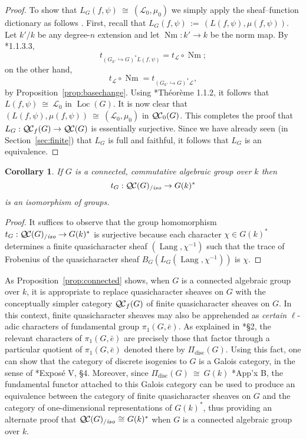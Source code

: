 \documentclass[11pt]{amsart}
\theoremstyle{plain}
\newtheorem{corollary}[theorem]{Corollary}
\theoremstyle{definition}
\theoremstyle{remark}
\newcommand{\bFq}{\bar{k}}
\newcommand{\Fq}{k}
\DeclareMathOperator{\Gal}{Gal}
\DeclareMathOperator{\Nm}{Nm}
\newcommand{\ceq}{{\, :=\, }}
\newcommand{\iso}{{\ \cong\ }}
\newcommand{\qcs}[1]{{\mathcal{#1}}}
\newcommand{\QC}{{\mathcal{Q\hskip-0.8pt C}}}
\newcommand{\QCb}{{\QC_0}}
\newcommand{\QCf}{{\QC_f}}
\newcommand{\QCiso}[1]{\QC(#1)_{/\textit{iso}}}
\newcommand{\Lang}{{\operatorname{Lang}}}
\newcommand{\Loc}{{\operatorname{Loc}}}
\newcommand{\trFrob}[1]{t_{#1}}
\begin{document}
\begin{proof}
  To show that $L_G(f,\psi) \iso (\qcs{L}_0,\mu_0)$ we simply apply the sheaf--function dictionary
  as follows .
  First, recall that $L_G(f,\psi) \ceq (L(f,\psi), \mu(f,\psi))$.
  Let $k'/k$ be any degree-$n$ extension and let $\Nm : k'\to k$ be the norm map. 
  By \cite{laumon:87a}*{1.1.3.3}, 
  \[
  \trFrob{(G_{k'}\hookrightarrow G)^*L(f,\psi)} = \trFrob{\qcs{L}} \circ \Nm;
  \]
  on the other hand, 
  \[
  \trFrob{\qcs{L}} \circ \Nm = \trFrob{(G_{k'}\hookrightarrow G)^*\qcs{L}},
  \]
   by Proposition~\ref{prop:basechange}.
  Using \cite{laumon:87a}*{Th\'eor\`eme 1.1.2}, it follows that  $L(f,\psi) \iso \qcs{L}_0$ in $\Loc(G)$.
  It is now clear that $(L(f,\psi),\mu(f,\psi)) \iso (\qcs{L}_0,\mu_0)$ in $\QCb(G)$.
  This completes the proof that $L_G : \QCf(G) \to \QC(G)$ is essentially surjective.
  Since we have already seen (in Section~\ref{sec:finite}) that $L_G$ is full and faithful, 
  it follows that $L_G$ is an equivalence.
\end{proof}

\begin{corollary}
 If $G$ is a connected, commutative algebraic group over $\Fq$ then
 \[
  \trFrob{G} : \QCiso{G} \to G(\Fq)^*
 \]
 is an isomorphism of groups.
\end{corollary}
\begin{proof}
 It suffices to observe that the group homomorphism
 $\trFrob{G} : \QCiso{G} \to G(\Fq)^*$
 is surjective because each character $\chi \in G(\Fq)^*$ determines a finite quasicharacter
 sheaf $(\Lang,\chi^{-1})$ such that the trace of Frobenius of the quasicharacter sheaf
 $B_G (L_G(\Lang,\chi^{-1}))$ is $\chi$.
\end{proof}

As Proposition~\ref{prop:connected} shows, 
when $G$ is a connected algebraic group over $\Fq$, 
it is appropriate to replace quasicharacter sheaves on $G$ 
with the conceptually simpler category $\QCf(G)$ of finite quasicharacter sheaves on $G$. 
In this context, finite quasicharacter sheaves may also be apprehended as
\emph{certain} $\ell$-adic characters of fundamental group $\pi_1(G,{\bar e})$. 
As explained in \cite{kamgarpour:09a}*{\S2}, 
the relevant characters of $\pi_1(G,{\bar e})$ are precisely those 
that factor through a particular quotient of $\pi_1(G,{\bar e})$ 
denoted there by $\Pi_\text{disc}(G)$.
Using this fact, one can show that the category of discrete isogenies to $G$ is a Galois category,
in the sense of \cite{grothendieck:SGA1}*{Expos\'e V, \S 4}. 
Moreover, since $\Pi_\text{disc}(G) \iso G(\Fq)$ \cite{kamgarpour:09a}*{App'x B}, 
the fundamental functor attached to this Galois category can be used to produce an equivalence
between the category of finite quasicharacter sheaves on $G$ and
the category of one-dimensional representations of $G(\Fq)^*$, thus
providing an alternate proof that $\QCiso{G} \iso G(\Fq)^*$ 
when $G$ is a connected algebraic group over $\Fq$.
\end{document}
